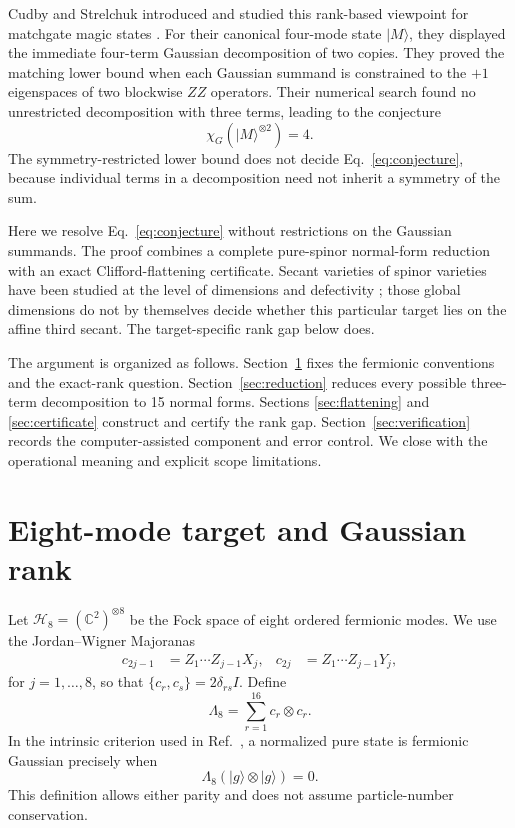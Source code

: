 \documentclass[aps,pra,reprint,groupedaddress,nofootinbib,longbibliography]{revtex4-2}
\newcommand{\ket}[1]{\lvert #1\rangle}
\newcommand{\C}{\mathbb{C}}
\begin{document}
Cudby and Strelchuk introduced and studied this rank-based viewpoint for
matchgate magic states \cite{CudbyStrelchuk2025}.  For their canonical
four-mode state $\ket M$, they displayed the immediate four-term Gaussian
decomposition of two copies.  They proved the matching lower bound when each
Gaussian summand is constrained to the $+1$ eigenspaces of two blockwise
$ZZ$ operators.  Their numerical search found no unrestricted decomposition
with three terms, leading to the conjecture
\begin{equation}
  \chi_G(\ket M^{\otimes2})=4 .
  \label{eq:conjecture}
\end{equation}
The symmetry-restricted lower bound does not decide Eq.~\eqref{eq:conjecture},
because individual terms in a decomposition need not inherit a symmetry of the
sum.

Here we resolve Eq.~\eqref{eq:conjecture} without restrictions on the Gaussian
summands.  The proof combines a complete pure-spinor normal-form reduction with
an exact Clifford-flattening certificate.  Secant varieties of spinor varieties
have been studied at the level of dimensions and defectivity
\cite{Angelini2011}; those global dimensions do not by themselves decide whether
this particular target lies on the affine third secant.  The target-specific
rank gap below does.

The argument is organized as follows.  Section~\ref{sec:model} fixes the
fermionic conventions and the exact-rank question.  Section~\ref{sec:reduction}
reduces every possible three-term decomposition to 15 normal forms.  Sections
\ref{sec:flattening} and \ref{sec:certificate} construct and certify the rank
gap.  Section~\ref{sec:verification} records the computer-assisted component
and error control.  We close with the operational meaning and explicit scope
limitations.

\section{Eight-mode target and Gaussian rank}
\label{sec:model}

Let $\mathcal H_8=(\C^2)^{\otimes8}$ be the Fock space of eight ordered
fermionic modes.  We use the Jordan--Wigner Majoranas
\begin{align}
 c_{2j-1}&=Z_1\cdots Z_{j-1}X_j, &
 c_{2j}&=Z_1\cdots Z_{j-1}Y_j,
 \label{eq:majoranas}
\end{align}
for $j=1,\ldots,8$, so that $\{c_r,c_s\}=2\delta_{rs}I$.  Define
\begin{equation}
 \Lambda_8=\sum_{r=1}^{16}c_r\otimes c_r .
\end{equation}
In the intrinsic criterion used in Ref.~\cite{CudbyStrelchuk2025}, a normalized
pure state is fermionic Gaussian precisely when
\begin{equation}
 \Lambda_8(\ket g\otimes\ket g)=0 .
 \label{eq:gaussian-criterion}
\end{equation}
This definition allows either parity and does not assume particle-number
conservation.
\end{document}
